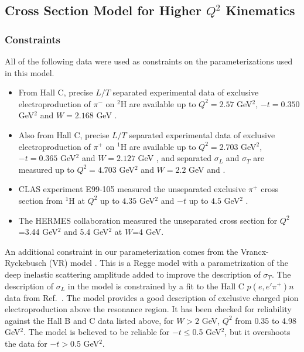\subsection{Cross Section Model for Higher $Q^2$ Kinematics
\label{sec:model}}

\subsubsection{Constraints}

All of the following data were used as constraints on the parameterizations
used in this model.
\begin{itemize}
\item
From Hall C, precise $L/T$ separated experimental data of exclusive
electroproduction of $\pi^{-}$ on $^2$H are available up to $Q^2=2.57$ GeV$^2$,
$-t=0.350$ GeV$^2$ and $W=2.168$ GeV \cite{gmhuber-2}.
\item
Also from Hall C, precise $L/T$ separated experimental data of exclusive
electroproduction of $\pi^{+}$ on $^1$H are available up to $Q^2=2.703$
GeV$^2$, $-t=0.365$ GeV$^2$ and $W=2.127$ GeV \cite{Fpi2}, and separated
$\sigma_{L}$ and $\sigma_{T}$ are measured up to $Q^2=4.703$ GeV$^2$ and
$W=2.2$ GeV \cite{hallc-1} and \cite{hallc-2}.
\item
CLAS experiment E99-105 measured the unseparated exclusive $\pi^+$ cross
section from $^1$H at $Q^2$ up to $4.35$ GeV$^2$ and $-t$ up to $4.5$ GeV$^2$
\cite{park}.
\item
The HERMES collaboration measured the unseparated cross section for $Q^2$=3.44
GeV$^2$ and 5.4 GeV$^2$ \cite{hermes} at $W$=4 GeV.
\end{itemize}

An additional constraint in our parameterization comes from the
Vrancx-Ryckebusch (VR) model \cite{vr}.  This is a Regge model with a
parametrization of the deep inelastic scattering amplitude added to improve the
description of $\sigma_{T}$.  The description of $\sigma_{L}$ in the model is
constrained by a fit to the Hall C $p(e,e'\pi^+)n$ data from
Ref.~\cite{Fpi2}.  The model provides a good description of exclusive
charged pion electroproduction above the resonance region.  It has been checked
for reliability against the Hall B and C data listed above, for $W>2$ GeV,
$Q^2$ from 0.35 to 4.98 GeV$^2$.  The model is believed to be reliable for
$-t\leq$0.5 GeV$^2$, but it overshoots the data for $-t>$0.5 GeV$^2$.

